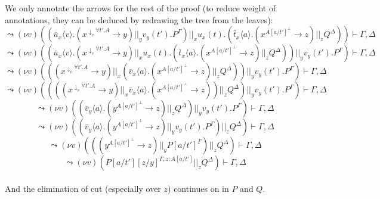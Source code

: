 \documentclass[a4paper,12pt]{article}
\begin{document}
~\\~\\
We only annotate the arrows for the rest of the proof (to reduce weight of annotations, they can be deduced by redrawing the tree from the leaves):\\
\[\leadsto (\nu v)((\bar{u}_x\langle v\rangle.(x^{\downarrow_v\forall t'.A}\to y) ||_y v_y(t').P^\Gamma) ||_x u_x(t).(\bar{t}_x\langle a\rangle.(x^{A[a/t']^\bot}\to z) ||_z Q^\Delta)) \vdash \Gamma,\Delta\]
\[\leadsto (\nu v)((\bar{u}_x\langle v\rangle.(x^{\downarrow_v\forall t'.A}\to y) ||_x u_x(t).(\bar{t}_x\langle a\rangle.(x^{A[a/t']^\bot}\to z) ||_z Q^\Delta)) ||_y v_y(t').P^\Gamma) \vdash \Gamma,\Delta\]
\[\leadsto (\nu v)(((x^{\downarrow_v\forall t'.A}\to y) ||_x (\bar{v}_x\langle a\rangle.(x^{A[a/t']^\bot}\to z) ||_z Q^\Delta)) ||_y v_y(t').P^\Gamma) \vdash \Gamma,\Delta\]
\[\leadsto (\nu v)((((x^{\downarrow_v\forall t'.A}\to y) ||_x \bar{v}_x\langle a\rangle.(x^{A[a/t']^\bot}\to z)) ||_z Q^\Delta) ||_y v_y(t').P^\Gamma) \vdash \Gamma,\Delta\]
\[\leadsto (\nu v)((\bar{v}_y\langle a\rangle.(y^{A[a/t']^\bot}\to z) ||_z Q^\Delta) ||_y v_y(t').P^\Gamma) \vdash \Gamma,\Delta\]
\[\leadsto (\nu v)((\bar{v}_y\langle a\rangle.(y^{A[a/t']^\bot}\to z) ||_y v_y(t').P^\Gamma) ||_z Q^\Delta) \vdash \Gamma,\Delta\]
\[\leadsto (\nu v)(((y^{A[a/t']^\bot}\to z) ||_y P[a/t']^\Gamma) ||_z Q^\Delta) \vdash \Gamma,\Delta\]
\[\leadsto (\nu v)(P[a/t'][z/y]^{\Gamma,z:A[a/t']} ||_z Q^\Delta) \vdash \Gamma,\Delta\]~\\
And the elimination of cut (especially over $z$) continues on in $P$ and $Q$.
\end{document}
